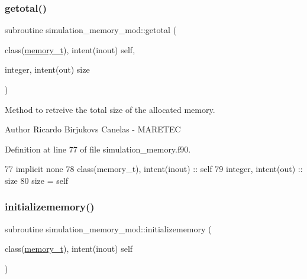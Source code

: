 \subsubsection{\texorpdfstring{getotal()}{getotal()}}
{\footnotesize\ttfamily subroutine simulation\+\_\+memory\+\_\+mod\+::getotal (\begin{DoxyParamCaption}\item[{class(\mbox{\hyperlink{structsimulation__memory__mod_1_1memory__t}{memory\+\_\+t}}), intent(inout)}]{self,  }\item[{integer, intent(out)}]{size }\end{DoxyParamCaption})\hspace{0.3cm}{\ttfamily [private]}}



Method to retreive the total size of the allocated memory. 

\begin{DoxyAuthor}{Author}
Ricardo Birjukovs Canelas -\/ M\+A\+R\+E\+T\+EC 
\end{DoxyAuthor}


Definition at line 77 of file simulation\+\_\+memory.\+f90.


\begin{DoxyCode}
77     \textcolor{keywordtype}{implicit none}
78     \textcolor{keywordtype}{class}(memory\_t), \textcolor{keywordtype}{intent(inout)} :: self
79     \textcolor{keywordtype}{integer}, \textcolor{keywordtype}{intent(out)} :: size
80     \textcolor{keyword}{size} = self%
\end{DoxyCode}
\mbox{\label{namespacesimulation__memory__mod_ac8306165e4ec88fec9a2b8b719f61893}} 
\subsubsection{\texorpdfstring{initializememory()}{initializememory()}}
{\footnotesize\ttfamily subroutine simulation\+\_\+memory\+\_\+mod\+::initializememory (\begin{DoxyParamCaption}\item[{class(\mbox{\hyperlink{structsimulation__memory__mod_1_1memory__t}{memory\+\_\+t}}), intent(inout)}]{self }\end{DoxyParamCaption})\hspace{0.3cm}{\ttfamily [private]}}



